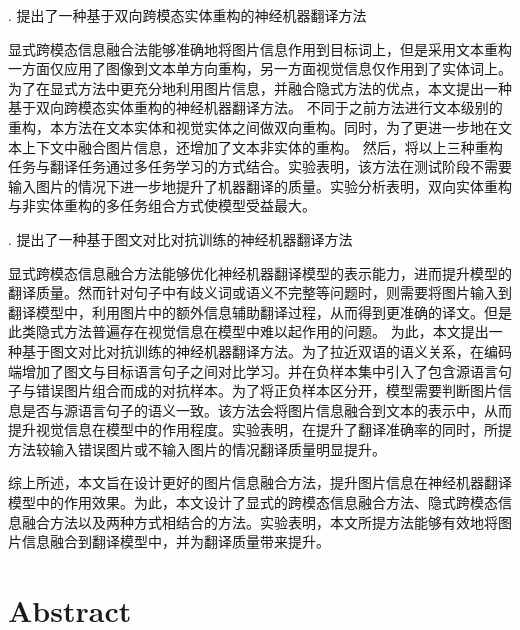 {. 提出了一种基于双向跨模态实体重构的神经机器翻译方法}

显式跨模态信息融合法能够准确地将图片信息作用到目标词上，但是采用文本重构一方面仅应用了图像到文本单方向重构，另一方面视觉信息仅作用到了实体词上。为了在显式方法中更充分地利用图片信息，并融合隐式方法的优点，本文提出一种基于双向跨模态实体重构的神经机器翻译方法。
不同于之前方法进行文本级别的重构，本方法在文本实体和视觉实体之间做双向重构。同时，为了更进一步地在文本上下文中融合图片信息，还增加了文本非实体的重构。%
然后，将以上三种重构任务与翻译任务通过多任务学习的方式结合。实验表明，该方法在测试阶段不需要输入图片的情况下进一步地提升了机器翻译的质量。实验分析表明，双向实体重构与非实体重构的多任务组合方式使模型受益最大。

{. 提出了一种基于图文对比对抗训练的神经机器翻译方法}

显式跨模态信息融合方法能够优化神经机器翻译模型的表示能力，进而提升模型的翻译质量。然而针对句子中有歧义词或语义不完整等问题时，则需要将图片输入到翻译模型中，利用图片中的额外信息辅助翻译过程，从而得到更准确的译文。但是此类隐式方法普遍存在视觉信息在模型中难以起作用的问题。
为此，本文提出一种基于图文对比对抗训练的神经机器翻译方法。为了拉近双语的语义关系，在编码端增加了图文与目标语言句子之间对比学习。并在负样本集中引入了包含源语言句子与错误图片组合而成的对抗样本。为了将正负样本区分开，模型需要判断图片信息是否与源语言句子的语义一致。该方法会将图片信息融合到文本的表示中，从而提升视觉信息在模型中的作用程度。实验表明，在提升了翻译准确率的同时，所提方法较输入错误图片或不输入图片的情况翻译质量明显提升。

综上所述，本文旨在设计更好的图片信息融合方法，提升图片信息在神经机器翻译模型中的作用效果。为此，本文设计了显式的跨模态信息融合方法、隐式跨模态信息融合方法以及两种方式相结合的方法。实验表明，本文所提方法能够有效地将图片信息融合到翻译模型中，并为翻译质量带来提升。

\intobmk\chapter*{Abstract}%

